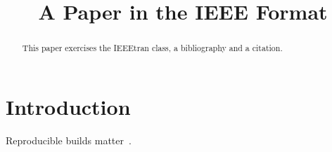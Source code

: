 \documentclass[conference]{IEEEtran}
\begin{document}
\title{A Paper in the IEEE Format}

\author{
}

\maketitle

\begin{abstract}
This paper exercises the IEEEtran class, a bibliography and a citation.
\end{abstract}

\section{Introduction}

Reproducible builds matter~\cite{reproducible}.



\end{document}
